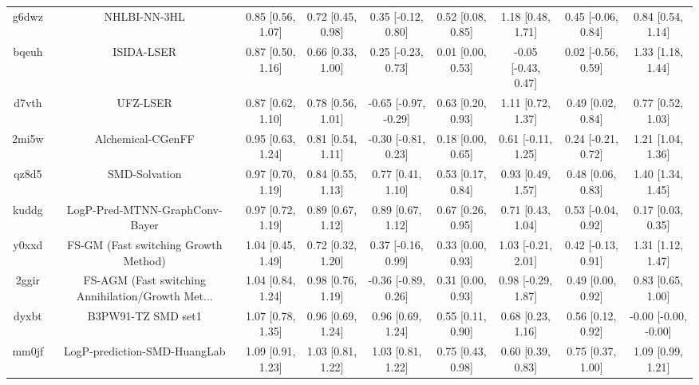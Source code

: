 \documentclass{article}
\begin{document}
\begin{center}
\begin{longtable}{|ccccccccc|}
 g6dwz &                                       NHLBI-NN-3HL &  0.85 [0.56, 1.07] &  0.72 [0.45, 0.98] &    0.35 [-0.12, 0.80] &  0.52 [0.08, 0.85] &    1.18 [0.48, 1.71] &   0.45 [-0.06, 0.84] &     0.84 [0.54, 1.14] \\
 bqeuh &                                         ISIDA-LSER &  0.87 [0.50, 1.16] &  0.66 [0.33, 1.00] &    0.25 [-0.23, 0.73] &  0.01 [0.00, 0.53] &  -0.05 [-0.43, 0.47] &   0.02 [-0.56, 0.59] &     1.33 [1.18, 1.44] \\
 d7vth &                                           UFZ-LSER &  0.87 [0.62, 1.10] &  0.78 [0.56, 1.01] &  -0.65 [-0.97, -0.29] &  0.63 [0.20, 0.93] &    1.11 [0.72, 1.37] &    0.49 [0.02, 0.84] &     0.77 [0.52, 1.03] \\
 2mi5w &                                  Alchemical-CGenFF &  0.95 [0.63, 1.24] &  0.81 [0.54, 1.11] &   -0.30 [-0.81, 0.23] &  0.18 [0.00, 0.65] &   0.61 [-0.11, 1.25] &   0.24 [-0.21, 0.72] &     1.21 [1.04, 1.36] \\
 qz8d5 &                                      SMD-Solvation &  0.97 [0.70, 1.19] &  0.84 [0.55, 1.13] &     0.77 [0.41, 1.10] &  0.53 [0.17, 0.84] &    0.93 [0.49, 1.57] &    0.48 [0.06, 0.83] &     1.40 [1.34, 1.45] \\
 kuddg &                     LogP-Pred-MTNN-GraphConv-Bayer &  0.97 [0.72, 1.19] &  0.89 [0.67, 1.12] &     0.89 [0.67, 1.12] &  0.67 [0.26, 0.95] &    0.71 [0.43, 1.04] &   0.53 [-0.04, 0.92] &     0.17 [0.03, 0.35] \\
 y0xxd &               FS-GM (Fast switching Growth Method) &  1.04 [0.45, 1.49] &  0.72 [0.32, 1.20] &    0.37 [-0.16, 0.99] &  0.33 [0.00, 0.93] &   1.03 [-0.21, 2.01] &   0.42 [-0.13, 0.91] &     1.31 [1.12, 1.47] \\
 2ggir &  FS-AGM (Fast switching Annihilation/Growth Met... &  1.04 [0.84, 1.24] &  0.98 [0.76, 1.19] &   -0.36 [-0.89, 0.26] &  0.31 [0.00, 0.93] &   0.98 [-0.29, 1.87] &    0.49 [0.00, 0.92] &     0.83 [0.65, 1.00] \\
 dyxbt &                                 B3PW91-TZ SMD set1 &  1.07 [0.78, 1.35] &  0.96 [0.69, 1.24] &     0.96 [0.69, 1.24] &  0.55 [0.11, 0.90] &    0.68 [0.23, 1.16] &    0.56 [0.12, 0.92] &  -0.00 [-0.00, -0.00] \\
 mm0jf &                       LogP-prediction-SMD-HuangLab &  1.09 [0.91, 1.23] &  1.03 [0.81, 1.22] &     1.03 [0.81, 1.22] &  0.75 [0.43, 0.98] &    0.60 [0.39, 0.83] &    0.75 [0.37, 1.00] &     1.09 [0.99, 1.21] \\

\end{longtable}
\end{center}
\end{document}
